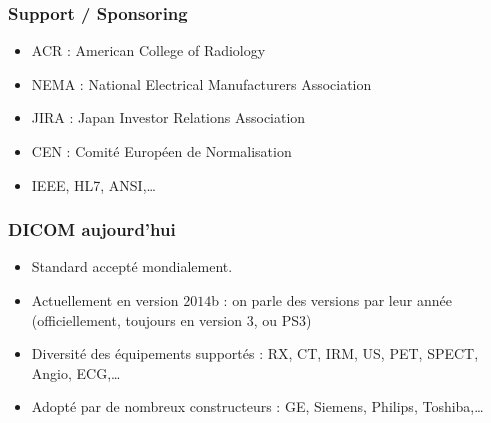 	\frame
	{
		\frametitle{Support / Sponsoring}
		\begin{itemize}
			\item ACR : American College of Radiology
			\item NEMA : National Electrical Manufacturers Association
			\item JIRA : Japan Investor Relations Association
			\item CEN : Comit\'e Europ\'een de Normalisation
			\item IEEE, HL7, ANSI,\ldots
		\end{itemize}
	}

	\frame
	{
		\frametitle{DICOM aujourd'hui}
		\begin{itemize}
			\item Standard accept\'e mondialement.
			\item Actuellement en version $2014$b : on parle des versions par leur ann\'ee (officiellement, toujours en version 3, ou PS3)
			\item Diversit\'e des \'equipements support\'es : RX, CT, IRM, US, PET, SPECT, Angio, ECG,\ldots
			\item Adopt\'e par de nombreux constructeurs : GE, Siemens, Philips, Toshiba,\ldots
		\end{itemize}
	}

